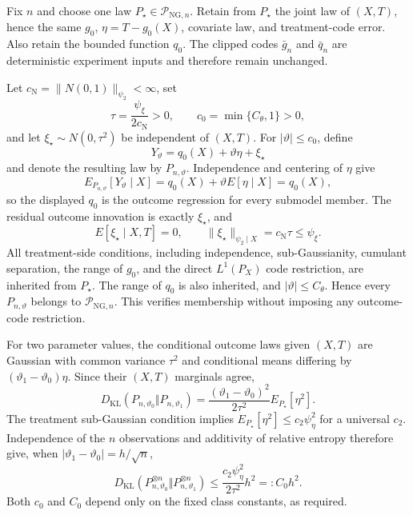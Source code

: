 Fix \(n\) and choose one law \(P_\star\in\mathcal P_{\mathrm{NG},n}\).  Retain from \(P_\star\) the joint law of \((X,T)\), hence the same \(g_0\), \(\eta=T-g_0(X)\), covariate law, and treatment-code error.  Also retain the bounded function \(q_0\).  The clipped codes \(\bar g_n\) and \(\bar q_n\) are deterministic experiment inputs and therefore remain unchanged.

Let \(c_{\mathrm N}=\lVert N(0,1)\rVert_{\psi_2}<\infty\), set
\[
 \tau=\frac{\psi_\xi}{2c_{\mathrm N}}>0,
 \qquad
 c_0=\min\{C_\theta,1\}>0,
\]
and let \(\xi_\star\sim N(0,\tau^2)\) be independent of \((X,T)\).  For \(|\vartheta|\le c_0\), define
\[
 Y_\vartheta=q_0(X)+\vartheta\eta+\xi_\star
\]
and denote the resulting law by \(P_{n,\vartheta}\).  Independence and centering of \(\eta\) give
\[
 E_{P_{n,\vartheta}}[Y_\vartheta\mid X]
 =q_0(X)+\vartheta E[\eta\mid X]
 =q_0(X),
\]
so the displayed \(q_0\) is the outcome regression for every submodel member.  The residual outcome innovation is exactly \(\xi_\star\), and
\[
 E[\xi_\star\mid X,T]=0,
 \qquad
 \lVert\xi_\star\rVert_{\psi_2\mid X}
 =c_{\mathrm N}\tau\le\psi_\xi.
\]
All treatment-side conditions, including independence, sub-Gaussianity, cumulant separation, the range of \(g_0\), and the direct \(L^1(P_X)\) code restriction, are inherited from \(P_\star\).  The range of \(q_0\) is also inherited, and \(|\vartheta|\le C_\theta\).  Hence every \(P_{n,\vartheta}\) belongs to \(\mathcal P_{\mathrm{NG},n}\).  This verifies membership without imposing any outcome-code restriction.

For two parameter values, the conditional outcome laws given \((X,T)\) are Gaussian with common variance \(\tau^2\) and conditional means differing by \((\vartheta_1-\vartheta_0)\eta\).  Since their \((X,T)\) marginals agree,
\[
 D_{\mathrm{KL}}(P_{n,\vartheta_0}\Vert P_{n,\vartheta_1})
 =\frac{(\vartheta_1-\vartheta_0)^2}{2\tau^2}E_{P_\star}[\eta^2].
\]
The treatment sub-Gaussian condition implies \(E_{P_\star}[\eta^2]\le c_2\psi_\eta^2\) for a universal \(c_2\).  Independence of the \(n\) observations and additivity of relative entropy therefore give, when \(|\vartheta_1-\vartheta_0|=h/\sqrt n\),
\[
 D_{\mathrm{KL}}(P_{n,\vartheta_0}^{\otimes n}\Vert
                  P_{n,\vartheta_1}^{\otimes n})
 \le \frac{c_2\psi_\eta^2}{2\tau^2}h^2
 =:C_0h^2.
\]
Both \(c_0\) and \(C_0\) depend only on the fixed class constants, as required.